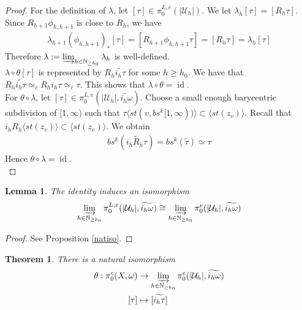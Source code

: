 \documentclass[a4paper,11pt]{article}
\theoremstyle{definition}
\theoremstyle{plain}
\newtheorem{theorem}[definition]{Theorem}
\newtheorem{lemma}[definition]{Lemma}
\theoremstyle{remark}
\DeclareMathOperator{\id}{id}
\begin{document}
{\begin{proof}
For the definition of $\lambda$, let $[\tau]\in  \pi^{L,e}_{0}(|\mathcal{U}_{h}|)$. We let $\lambda_{h}[\tau] = [R_{h}\tau]$. Since $R_{h+1} \phi_{h,h+1}$ is close to $R_{h}$, we have 
\begin{align*}
\lambda_{h+1}(\phi_{h,h+1})_{\ast}[\tau] = [R_{h+1}\phi_{h,h+1}\tau] =[R_{h}\tau] = \lambda_{h}[\tau]
\end{align*} Therefore $\lambda:= \varinjlim_{h\in \mathbb{N}_{\geq h_0}} \lambda_{h}$ is well-defined. \\

$\lambda\circ \theta[\tau]$ is represented by $R_{h}\widetilde{i_{h}\tau}$ for some $h\geq h_0$. We have that $R_{h}\widetilde{i_{h}\tau}\simeq_{c} R_{h}i_{h}\tau\simeq_{c}\tau$. This shows that $\lambda \circ \theta = \id$. \\

For $\theta \circ \lambda$, let $[\tau]\in \pi_{0}^{L,e}(|\mathcal{U}_{h}|,\widetilde{i_{h}\omega})$. Choose a small enough barycentric subdivision of $[1,\infty)$ such that $\tau \langle st(v, bs^{k}[1,\infty))\rangle \subset \langle st(z_{v})\rangle$. Recall that $i_{h}R_{h} \langle st(z_v)\rangle\subset \langle st(z_v) \rangle $. We obtain
\begin{align*}
bs^{k}(\widetilde{i_{h}R_{h}\tau})= bs^{k}(\widetilde{\tau}) \simeq \tau
\end{align*}
Hence $\theta\circ \lambda = \id$. \\

\end{proof}

\begin{lemma} The identity induces an isomorphism 
\begin{align*}
\varinjlim_{h\in \mathbb{N}_{\geq h_0}} \pi_0^{L,e}(|\mathcal{U}_{h}|,\widetilde{i_{h}\omega})\cong \varinjlim_{h\in \mathbb{N}_{\geq h_0}}  \pi_0^{e}(|\mathcal{U}_{h}|,\widetilde{i_{h}\omega})
\end{align*}
\end{lemma}

\begin{proof} See Proposition \ref{natiso}. 
\end{proof}

\begin{theorem} \label{main2}There is a natural isomorphism 
\begin{align*}
\theta: \pi_{0}^{c}(X,\omega) &\rightarrow \varinjlim_{h\in \mathbb{N}_{\geq h_0}}\pi^{e}_{0}(|\mathcal{U}_{h}|, \widetilde{i_{h}\omega})\\
[\tau] &\mapsto [\widetilde{i_{h} \tau}]
\end{align*}
\end{theorem}

}
\end{document}
